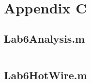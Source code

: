 \chapter{Appendix C}
\section{Lab6Analysis.m} \label{sec:analysis_code}

\inputminted{matlab}{Code/Lab6Analysis.m}\label{listing:data_analysis_script}

\section{Lab6HotWire.m} \label{sec:calibration_code}

\inputminted{matlab}{Code/Lab6HotWire.m}\label{listing:calibration_script}